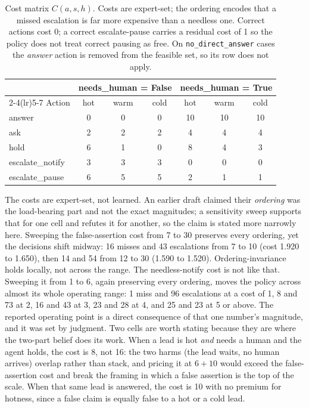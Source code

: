 \documentclass{article}
\begin{document}
\begin{table}[t]
\centering
\setlength{\tabcolsep}{4pt}
\small
\begin{tabular}{lcccccc}
\toprule
& \multicolumn{3}{c}{needs\_human = False} & \multicolumn{3}{c}{needs\_human = True} \\
\cmidrule(lr){2-4}\cmidrule(lr){5-7}
Action & hot & warm & cold & hot & warm & cold \\
\midrule
answer           & 0 & 0 & 0 & 10 & 10 & 10 \\
ask              & 2 & 2 & 2 & 4  & 4  & 4  \\
hold             & 6 & 1 & 0 & 8  & 4  & 3  \\
escalate\_notify & 3 & 3 & 3 & 0  & 0  & 0  \\
escalate\_pause  & 6 & 5 & 5 & 2  & 1  & 1  \\
\bottomrule
\end{tabular}
\caption{Cost matrix $C(a,s,h)$. Costs are expert-set; the ordering encodes
that a missed escalation is far more expensive than a needless one. Correct
actions cost 0; a correct escalate-pause carries a residual cost of 1 so the
policy does not treat correct pausing as free. On \texttt{no\_direct\_answer}
cases the \emph{answer} action is removed from the feasible set, so its row
does not apply.}
\label{tab:costs}
\end{table}

The costs are expert-set, not learned. An earlier draft claimed their
\emph{ordering} was the load-bearing part and not the exact magnitudes; a
sensitivity sweep supports that for one cell and refutes it for another, so the
claim is stated more narrowly here. Sweeping the false-assertion cost from 7 to 30
preserves every ordering, yet the decisions shift midway: 16 misses and 43
escalations from 7 to 10 (cost 1.920 to 1.650), then 14 and 54 from 12 to 30 (1.590
to 1.520). Ordering-invariance holds locally, not across the range. The
needless-notify cost is not like that. Sweeping it from 1 to 6, again preserving
every ordering, moves the policy across almost its whole operating range: 1 miss and
96 escalations at a cost of 1, 8 and 73 at 2, 16 and 43 at 3, 23 and 28 at 4, and 25
and 23 at 5 or above. The reported operating point is a direct consequence of that
one number's magnitude, and it was set by judgment. Two cells are worth stating
because they are where the two-part belief does its work. When a lead is hot
\emph{and} needs a human and the agent holds, the cost is 8, not 16: the two
harms (the lead waits, no human arrives) overlap rather than stack, and pricing
it at $6+10$ would exceed the false-assertion cost and break the framing in
which a false assertion is the top of the scale. When that same lead is
answered, the cost is 10 with no premium for hotness, since a false claim is
equally false to a hot or a cold lead.
\end{document}
